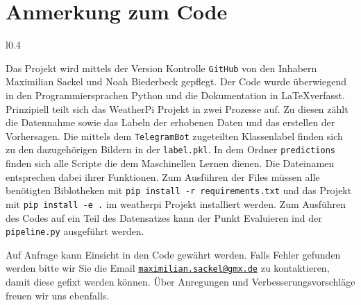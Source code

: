 \newpage
\section{Anmerkung zum Code}
\label{sec:06_code_anhang}
\begin{wrapfigure}{l}{0.4\textwidth}
\end{wrapfigure}
Das Projekt wird mittels der Version Kontrolle \texttt{GitHub} von den Inhabern
Maximilian Sackel
und Noah Biederbeck gepflegt. 
Der Code wurde überwiegend in den Programmiersprachen Python und die
Dokumentation in \LaTeX verfasst.
Prinzipiell teilt sich das WeatherPi Projekt in zwei Prozesse auf. 
Zu diesen zählt die Datennahme sowie das Labeln der erhobenen Daten und das
erstellen der Vorhersagen.
Die mittels dem \texttt{TelegramBot} zugeteilten Klassenlabel finden sich zu den
dazugehörigen Bildern in der \texttt{label.pkl}.
In dem Ordner \texttt{predictions} finden sich alle Scripte die dem Maschinellen
Lernen dienen.
Die Dateinamen entsprechen dabei ihrer Funktionen.
Zum Ausführen der Files müssen alle benötigten Biblotheken mit 
\verb|pip install -r requirements.txt| und das Projekt mit 
\verb|pip install -e .| im weatherpi Projekt installiert werden. 
Zum Ausführen des Codes auf ein Teil des Datensatzes kann der Punkt Evaluieren
ind der \texttt{pipeline.py} ausgeführt werden.

Auf Anfrage kann Einsicht in den Code gewährt werden.
Falls Fehler gefunden werden bitte wir Sie die Email
\href{mailto:maximilian.sackel@gmx.de}{\texttt{maximilian.sackel@gmx.de}} zu 
kontaktieren, damit diese gefixt werden können.
Über Anregungen und Verbesserungsvorschläge freuen wir uns ebenfalls.
